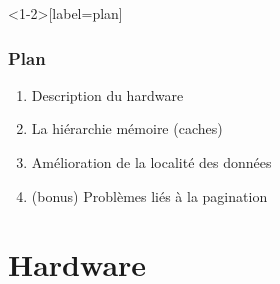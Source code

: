 \documentclass[xcolor={x11names,svgnames}]{beamer}
\begin{document}

\begin{frame}<1-2>[label=plan]
  \frametitle{Plan}

  \begin{enumerate}
  \item<alert@2> Description du hardware

    \bigskip
    
  \item La hiérarchie mémoire (caches)

    \bigskip

  \item Amélioration de la localité des données

        \bigskip

  \item (bonus) Problèmes liés à la pagination
  \end{enumerate}
  
\end{frame}



\section{Hardware}
\end{document}
